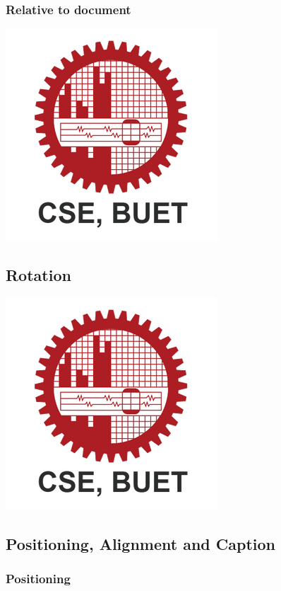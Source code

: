 \documentclass{article}
\begin{document}
\subsubsection{Relative to document}
\includegraphics[width=.5\textwidth]{Images/CSE_BUET.png}

\pagebreak

\subsection{Rotation}
\includegraphics[scale=.5,angle=45]{Images/CSE_BUET.png}

\pagebreak

\subsection{Positioning, Alignment and Caption }  %

\subsubsection{Positioning}
\end{document}

